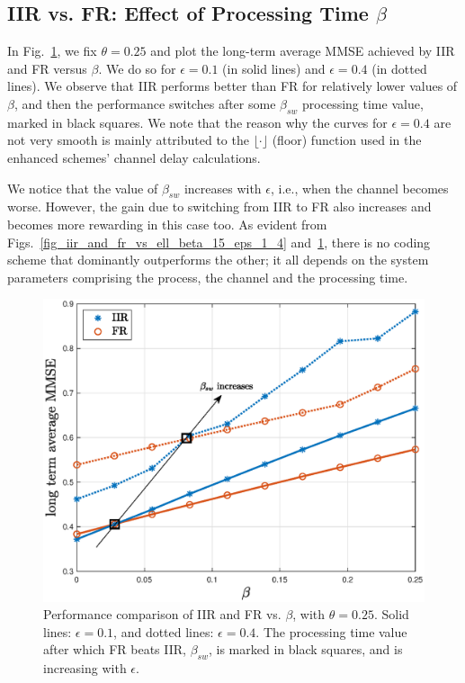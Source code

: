 \documentclass[12pt,journal,onecolumn]{IEEEtran}
\begin{document}
\subsection{IIR vs. FR: Effect of Processing Time $\beta$}

In Fig.~\ref{fig_iir_and_fr_vs_beta_theta_25_eps_1_4}, we fix $\theta=0.25$ and plot the long-term average MMSE achieved by IIR and FR versus $\beta$. We do so for $\epsilon=0.1$ (in solid lines) and $\epsilon=0.4$ (in dotted lines). We observe that IIR performs better than FR for relatively lower values of $\beta$, and then the performance switches after some $\beta_{sw}$ processing time value, marked in black squares. We note that the reason why the curves for $\epsilon=0.4$ are not very smooth is mainly attributed to the $\lfloor\cdot\rfloor$ (floor) function used in the enhanced schemes' channel delay calculations.

We notice that the value of $\beta_{sw}$ increases with $\epsilon$, i.e., when the channel becomes worse. However, the gain due to switching from IIR to FR also increases and becomes more rewarding in this case too. As evident from Figs.~\ref{fig_iir_and_fr_vs_ell_beta_15_eps_1_4} and~\ref{fig_iir_and_fr_vs_beta_theta_25_eps_1_4}, there is no coding scheme that dominantly outperforms the other; it all depends on the system parameters comprising the process, the channel and the processing time.

\begin{figure}[t]
\center
\includegraphics[scale=.5]{iir_and_fr_vs_beta_theta_25_eps_1_4}
\caption{Performance comparison of IIR and FR vs. $\beta$, with $\theta=0.25$. Solid lines: $\epsilon=0.1$, and dotted lines: $\epsilon=0.4$. The processing time value after which FR beats IIR, $\beta_{sw}$, is marked in black squares, and is increasing with $\epsilon$.}
\label{fig_iir_and_fr_vs_beta_theta_25_eps_1_4}
\end{figure}
\end{document}
